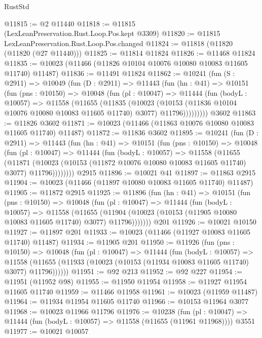 \begin{lexlean}{RustStd}
\begin{coremodule}
@11815 := @2 @11440
@11818 := @11815 (LexLeanPreservation.Rust.Loop.Pos.kept @3309)
@11820 := @11815 LexLeanPreservation.Rust.Loop.Pos.changed
@11824 := @11818 (@11820 (@11820 (@27 @11440)))
@11825 := @11814 @11824
@11826 := @11468 @11824
@11835 := @10023 (@11466 (@11826 @10104 @10076 @10080 @10083 @11605 @11740) @11487)
@11836 := @11491 @11824
@11862 := @10241
    (fun (S : @2911) =>
    @10049
      (fun (D : @2911) =>
      @11443
        (fun (hn : @41) =>
        @10151
          (fun (pns : @10150) =>
          @10048
            (fun (pl : @10047) =>
            @11444
              (fun (bodyL : @10057) =>
              @11558
                (@11655
                  (@11835
                    (@10023
                      (@10153 (@11836 @10104 @10076 @10080 @10083 @11605 @11740) @3077)
                      @11796)))))))))
    @3602
@11863 := @11826 @3602
@11871 := @10023 (@11466 (@11863 @10076 @10080 @10083 @11605 @11740) @11487)
@11872 := @11836 @3602
@11895 := @10241
    (fun (D : @2911) =>
    @11443
      (fun (hn : @41) =>
      @10151
        (fun (pns : @10150) =>
        @10048
          (fun (pl : @10047) =>
          @11444
            (fun (bodyL : @10057) =>
            @11558
              (@11655
                (@11871
                  (@10023 (@10153 (@11872 @10076 @10080 @10083 @11605 @11740) @3077) @11796))))))))
    @2915
@11896 := @10021 @41
@11897 := @11863 @2915
@11904 := @10023 (@11466 (@11897 @10080 @10083 @11605 @11740) @11487)
@11905 := @11872 @2915
@11925 := @11896
    (fun (hn : @41) =>
    @10151
      (fun (pns : @10150) =>
      @10048
        (fun (pl : @10047) =>
        @11444
          (fun (bodyL : @10057) =>
          @11558
            (@11655
              (@11904 (@10023 (@10153 (@11905 @10080 @10083 @11605 @11740) @3077) @11796)))))))
    @201
@11926 := @10021 @10150
@11927 := @11897 @201
@11933 := @10023 (@11466 (@11927 @10083 @11605 @11740) @11487)
@11934 := @11905 @201
@11950 := @11926
    (fun (pns : @10150) =>
    @10048
      (fun (pl : @10047) =>
      @11444
        (fun (bodyL : @10057) =>
        @11558 (@11655 (@11933 (@10023 (@10153 (@11934 @10083 @11605 @11740) @3077) @11796))))))
@11951 := @92 @213
@11952 := @92 @227
@11954 := @11951 (@11952 @98)
@11955 := @11950 @11954
@11958 := @11927 @11954 @11605 @11740
@11959 := @11466 @11958
@11961 := @10023 (@11959 @11487)
@11964 := @11934 @11954 @11605 @11740
@11966 := @10153 @11964 @3077
@11968 := @10023 @11966 @11796
@11976 := @10238
    (fun (pl : @10047) => @11444 (fun (bodyL : @10057) => @11558 (@11655 (@11961 @11968))))
    @3551
@11977 := @10021 @10057

\end{coremodule}
\end{lexlean}
